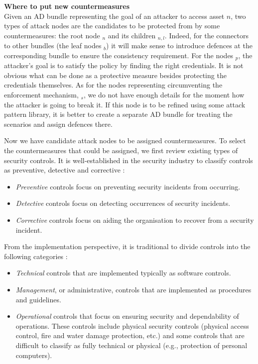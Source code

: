 \documentclass{llncs}
\begin{document}
\textbf{Where to put new countermeasures}\\
Given an AD bundle representing the goal of an attacker to access asset $n$, two types of attack nodes are the candidates to be protected from by some countermeasures: the root node \taccess$_n$ and its children \taccfrom$_{n,l}$. Indeed, for the connectors to other bundles (the leaf nodes \taccess$_b$) it will make sense to introduce defences at the corresponding bundle to ensure the consistency requirement. For the nodes \tsatpol$_p$, the attacker's goal is to satisfy the policy by finding the right credentials. It is not obvious what can be done as a protective measure besides protecting the credentials themselves. As for the nodes representing circumventing the enforcement mechanism, \tbreak$_{s}$, we do not have enough details for the moment how the attacker is going to break it. If this node is to be refined using some attack pattern library, it is better to create a separate AD bundle for treating the scenarios and assign defences there.

Now we have candidate attack nodes to be assigned countermeasures. To select the countermeasures that could be assigned, we first review existing types of security controls. It is well-established in the security industry to classify controls as preventive, detective and corrective \cite{NIST-800-30}:
\begin{itemize}
\item \emph{Preventive}	controls focus on preventing security incidents from occurring. 
\item \emph{Detective} controls focus on detecting occurrences of security incidents.
\item \emph{Corrective} controls focus on aiding the organisation to recover from a security incident. 
\end{itemize}

From the implementation perspective, it is traditional to divide controls into the following categories \cite{NIST-800-30}:
\begin{itemize}
\item \emph{Technical} controls that are implemented typically as software controls.
\item \emph{Management}, or administrative, controls that are implemented as procedures and guidelines.
\item \emph{Operational} controls that focus on ensuring security and dependability of operations. These controls include physical security controls (physical access control, fire and water damage protection, etc.) and some controls that are difficult to classify as fully technical or physical (e.g., protection of personal computers).   	
\end{itemize}
\end{document}
